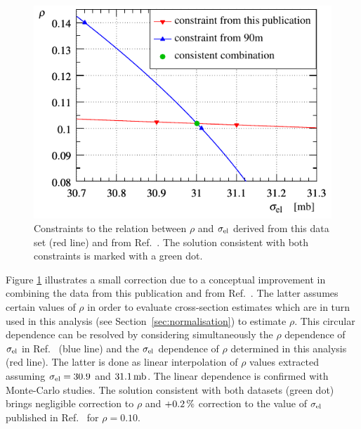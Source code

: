\begin{figure}
\vskip-5mm
\begin{center}
\includegraphics{fig/si_el_rho_solution.pdf}
\vskip-3mm
\caption{%
Constraints to the relation between $\rho$ and $\sigma_{\rm el}$ derived from this data set (red line) and from Ref.~\cite{totem-13tev-90m}. The solution consistent with both constraints is marked with a green dot.
}
\label{fig:si_el rho sol}
\end{center}
\vskip-2mm
\end{figure}


Figure \ref{fig:si_el rho sol} illustrates a small correction due to a conceptual improvement in combining the data from this publication and from Ref.~\cite{totem-13tev-90m}. The latter assumes certain values of $\rho$ in order to evaluate cross-section estimates which are in turn used in this analysis (see Section~\ref{sec:normalisation}) to estimate $\rho$. This circular dependence can be resolved by considering simultaneously the $\rho$ dependence of $\sigma_{\rm el}$ in Ref.~\cite{totem-13tev-90m} (blue line) and the $\sigma_{\rm el}$ dependence of $\rho$ determined in this analysis (red line). The latter is done as linear interpolation of $\rho$ values extracted assuming $\sigma_{\rm el} = 30.9$ and $31.1\,{\rm mb}$. The linear dependence is confirmed with Monte-Carlo studies. The solution consistent with both datasets (green dot) brings negligible correction to $\rho$ and $+0.2\,{\rm \%}$ correction to the value of $\sigma_{\rm el}$ published in Ref.~\cite{totem-13tev-90m} for $\rho=0.10$.
